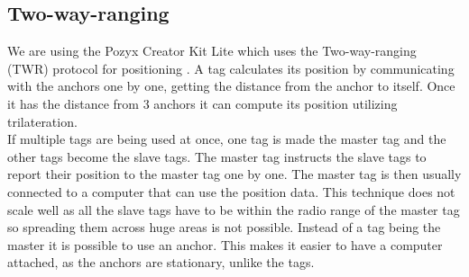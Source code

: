 \subsection{Two-way-ranging}
We are using the Pozyx Creator Kit Lite which uses the Two-way-ranging (TWR) protocol for positioning \cite{pozyx-Positioning}.
A tag calculates its position by communicating with the anchors one by one, getting the distance from the anchor to itself.
Once it has the distance from 3 anchors it can compute its position utilizing trilateration.
\\
If multiple tags are being used at once, one tag is made the master tag and the other tags become the slave tags.
The master tag instructs the slave tags to report their position to the master tag one by one.
The master tag is then usually connected to a computer that can use the position data.
This technique does not scale well as all the slave tags have to be within the radio range of the master tag so spreading them across huge areas is not possible.
Instead of a tag being the master it is possible to use an anchor.
This makes it easier to have a computer attached, as the anchors are stationary, unlike the tags.
